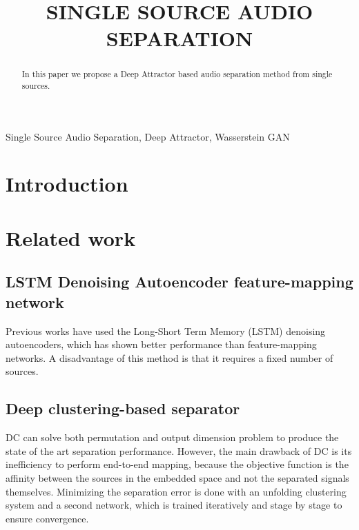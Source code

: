 \documentclass{article}
\title{SINGLE SOURCE AUDIO SEPARATION}
\begin{document}
%
\maketitle
%
\begin{abstract}
In this paper we propose a Deep Attractor  based audio separation method from single sources.
\end{abstract}
%
\begin{keywords}
Single Source Audio Separation, Deep Attractor, Wasserstein GAN
\end{keywords}
%
\section{Introduction}
\label{sec:intro}



\section{Related work}
\label{sec:related}
\subsection{LSTM Denoising Autoencoder feature-mapping network }
Previous works have used the Long-Short Term Memory (LSTM) denoising autoencoders, which has 
shown better performance than feature-mapping networks. A disadvantage of this method is that it requires
a fixed number of sources. 
\subsection{Deep clustering-based separator}
DC can solve both permutation and output dimension problem to produce the state of the art separation performance. 
However, the main drawback of DC is its inefficiency to perform end-to-end mapping, because the objective function is the affinity between the sources in the embedded space and not the separated signals themselves. Minimizing the separation error is done with an unfolding clustering system and a second network, which is trained iteratively and stage by stage to ensure convergence.
\end{document}
